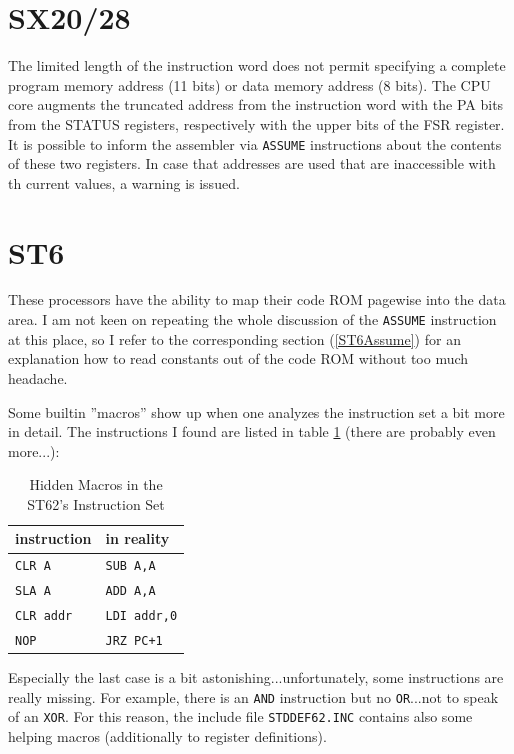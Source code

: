 \documentclass[12pt,twoside]{report}
\newcommand{\tty}[1]{{\tt #1}}
\begin{document}

\section{SX20/28}

The limited length of the instruction word does not permit specifying
a complete program memory address (11 bits) or data memory address (8
bits).  The CPU core augments the truncated address from the
instruction word with the PA bits from the STATUS registers,
respectively with the upper bits of the FSR register.  It is possible
to inform the assembler via \tty{ASSUME} instructions about the
contents of these two registers.  In case that addresses are used
that are inaccessible with th current values, a warning is issued.


\section{ST6}

These processors have the ability to map their code ROM pagewise into the
data area.  I am not keen on repeating the whole discussion of the
\tty{ASSUME} instruction at this place, so I refer to the corresponding
section (\ref{ST6Assume}) for an explanation how to read constants out of
the code ROM without too much headache.

Some builtin ''macros'' show up when one analyzes the instruction set a
bit more in detail.  The instructions I found are listed in table
\ref{TabHid62} (there are probably even more...):
\par
\begin{table}[htbp]
\begin{center}\begin{tabular}{|l|l|}
\hline
instruction & in reality \\
\hline
\hline
\tty{CLR A}      & \tty{SUB A,A} \\
\tty{SLA A}      & \tty{ADD A,A} \\
\tty{CLR addr}   & \tty{LDI addr,0} \\
\tty{NOP}        & \tty{JRZ PC+1} \\
\hline
\end{tabular}\end{center}
\caption{Hidden Macros in the ST62's Instruction Set\label{TabHid62}}
\end{table}
Especially the last case is a bit astonishing...unfortunately, some
instructions are really missing.  For example, there is an \tty{AND}
instruction but no \tty{OR}...not to speak of an \tty{XOR}.  For this reason, the
include file \tty{STDDEF62.INC} contains also some helping macros
(additionally to register definitions).
\end{document}
